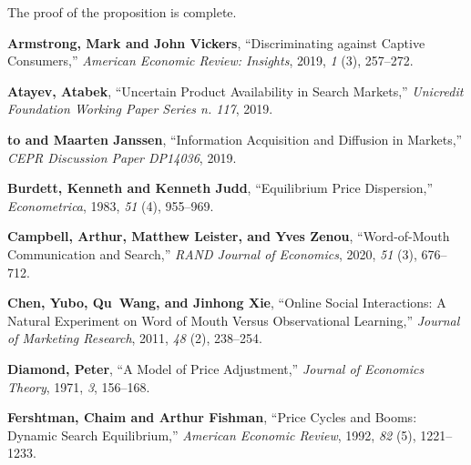 \documentclass[12pt]{article}
\begin{document}
The proof of the proposition is complete.  






\pagebreak 

{}

\ifx\undefined\bysame
\newcommand{\bysame}{\leavevmode\hbox 
to\leftmargin{\hrulefill\,\,}}
\fi
\begin{thebibliography}{xx}
	
	{\bf Armstrong, Mark and John Vickers}, ``Discriminating 
	against Captive
	Consumers,'' {\it American Economic Review: Insights}, 2019, 
	{\it 1} (3),
	257--272.
	
	{\bf Atayev, Atabek}, ``Uncertain Product Availability in 
	Search Markets,''
	{\it Unicredit Foundation Working Paper Series n. 117}, 2019.
	
	{\bf \bysame{} and Maarten Janssen}, ``Information 
	Acquisition and Diffusion in
	Markets,'' {\it CEPR Discussion Paper DP14036}, 2019.
	
	{\bf Burdett, Kenneth and Kenneth Judd}, ``Equilibrium Price 
	Dispersion,'' {\it
		Econometrica}, 1983, {\it 51} (4), 955--969.
	
	{\bf Campbell, Arthur, Matthew Leister, and Yves Zenou}, 
	``Word-of-Mouth
	Communication and Search,'' {\it RAND Journal of Economics}, 
	2020, {\it 51}
	(3), 676--712.
	
	{\bf Chen, Yubo, Qu~Wang, and Jinhong Xie}, ``Online Social 
	Interactions: A
	Natural Experiment on Word of Mouth Versus Observational 
	Learning,'' {\it
		Journal of Marketing Research}, 2011, {\it 48} (2), 
		238--254.
	
	{\bf Diamond, Peter}, ``A Model of Price Adjustment,'' {\it 
	Journal of
		Economics Theory}, 1971, {\it 3}, 156--168.
	
	{\bf Fershtman, Chaim and Arthur Fishman}, ``Price Cycles 
	and Booms: Dynamic
	Search Equilibrium,'' {\it American Economic Review}, 1992, 
	{\it 82} (5),
	1221--1233.
	

\end{thebibliography}
\end{document}
